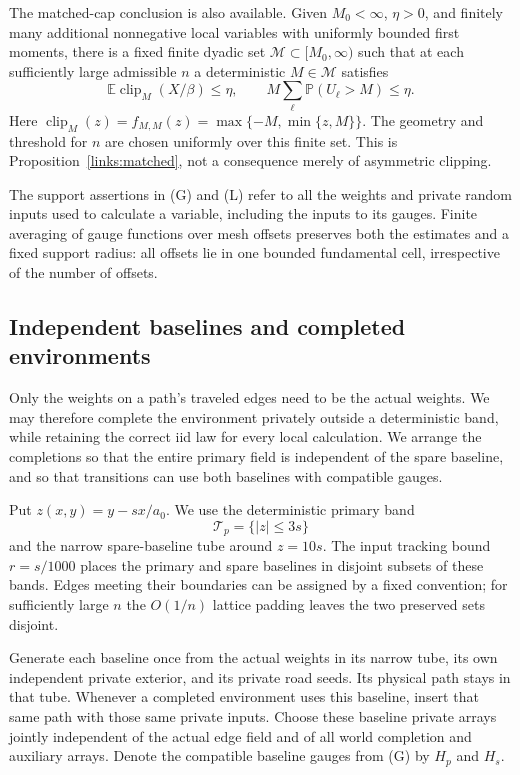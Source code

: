 \begin{enumerate}
The matched-cap conclusion is also available. Given $M_0<\infty$,
$\eta>0$, and finitely many additional nonnegative local variables
with uniformly bounded first moments, there is a fixed finite dyadic
set $\mathcal M\subset[M_0,\infty)$ such that at each sufficiently
large admissible $n$ a deterministic $M\in\mathcal M$ satisfies
\begin{equation}
 \mathbb E\operatorname{clip}_M(X/\beta)\leq\eta,
 \qquad
 M\sum_\ell\mathbb P(U_\ell>M)\leq\eta.
 \label{improvement:interfaces:eq1}
\end{equation}
Here $\operatorname{clip}_M(z)=f_{M,M}(z)=\max\{-M,\min\{z,M\}\}$.
The geometry and threshold for $n$ are chosen uniformly over this
finite set. This is Proposition~\ref{links:matched},
not a consequence merely of asymmetric clipping.
\end{enumerate}

The support assertions in (G) and (L) refer to all the weights and
private random inputs used to calculate a variable, including the
inputs to its gauges. Finite averaging of gauge functions over mesh
offsets preserves both the estimates and a fixed support radius:
all offsets lie in one bounded fundamental cell, irrespective of the
number of offsets.

\subsection{Independent baselines and completed environments}
\label{improvement:worlds}

Only the weights on a path's traveled edges need to be the actual
weights. We may therefore complete the environment privately outside a
deterministic band, while retaining the correct iid law for every local
calculation. We arrange the completions so that the entire primary field
is independent of the spare baseline, and so that transitions can use
both baselines with compatible gauges.

Put $z(x,y)=y-sx/a_0$. We use the deterministic primary band
\[
 \mathcal T_p=\{|z|\leq3s\}
\]
and the narrow spare-baseline tube around $z=10s$. The input tracking
bound $r=s/1000$ places the primary and spare baselines in disjoint
subsets of these bands. Edges meeting their boundaries can be assigned
by a fixed convention; for sufficiently large $n$ the $O(1/n)$ lattice
padding leaves the two preserved sets disjoint.

Generate each baseline once from the actual weights in its narrow tube,
its own independent private exterior, and its private road seeds. Its
physical path stays in that tube. Whenever a completed environment uses
this baseline, insert that same path with those same private inputs.
Choose these baseline private arrays jointly independent of the actual
edge field and of all world completion and auxiliary arrays. Denote the
compatible baseline gauges from (G) by $H_p$ and $H_s$.

